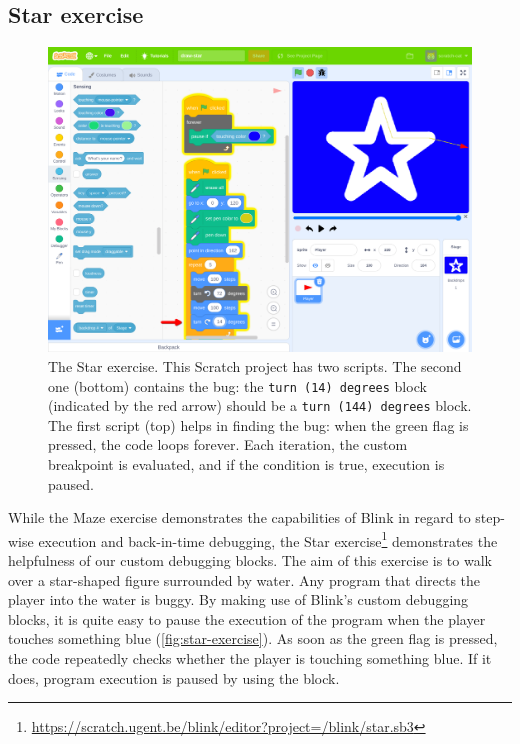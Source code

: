 \documentclass[../main]{subfiles}
\begin{document}
\subsection{Star exercise}\label{subsec:star-exercise}

\begin{figure}
    \begin{wide}
        \includegraphics[width=\linewidth]{draw-star}
    \end{wide}
    \caption{
        The Star exercise.
        This Scratch project has two scripts.
        The second one (bottom) contains the bug: the \texttt{turn (14) degrees} block (indicated by the red arrow) should be a \texttt{turn (144) degrees} block.
        The first script (top) helps in finding the bug: when the green flag is pressed, the code loops forever.
        Each iteration, the custom breakpoint is evaluated, and if the condition is true, execution is paused.
    }
    \label{fig:star-exercise}
\end{figure}

While the Maze exercise demonstrates the capabilities of Blink in regard to step-wise execution and back-in-time debugging, the Star exercise\footnote{\url{https://scratch.ugent.be/blink/editor?project=/blink/star.sb3}} demonstrates the helpfulness of our custom debugging blocks.
The aim of this exercise is to walk over a star-shaped figure surrounded by water.
Any program that directs the player into the water is buggy.
By making use of Blink's custom debugging blocks, it is quite easy to pause the execution of the program when the player touches something blue (\vref{fig:star-exercise}).
As soon as the green flag is pressed, the code repeatedly checks whether the player is touching something blue.
If it does, program execution is paused by using the  block.
\end{document}
